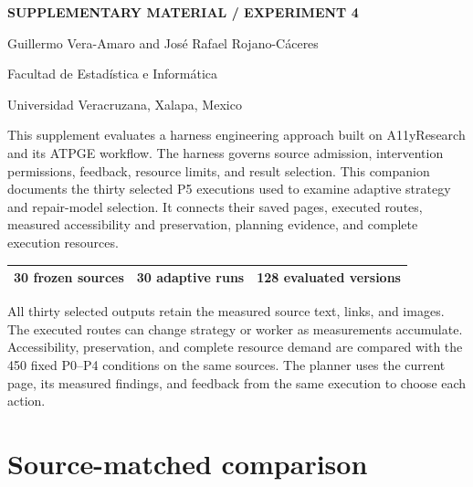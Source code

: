 \documentclass[acmsmall,screen,nonacm]{acmart}
\begin{document}
\raggedbottom
\pagestyle{plain}
\begin{titlepage}
\vspace*{12pt}
\noindent\textcolor{HarnessBlue}{\textbf{SUPPLEMENTARY MATERIAL / EXPERIMENT 4}}\par\bigskip
{}
\medskip
{}
\vspace{22pt}
\noindent Guillermo Vera-Amaro and José Rafael Rojano-Cáceres\par
\medskip
\noindent Facultad de Estadística e Informática\par
\noindent Universidad Veracruzana, Xalapa, Mexico\par
\vspace{24pt}
\noindent{\Large\bfseries\textcolor{HarnessBlue}{Experiment 4. Adaptive strategy and model selection}\par}
\medskip
This supplement evaluates a harness engineering approach built on A11yResearch and its ATPGE workflow. The harness governs source admission, intervention permissions, feedback, resource limits, and result selection. This companion documents the thirty selected P5 executions used to examine adaptive strategy and repair-model selection. It connects their saved pages, executed routes, measured accessibility and preservation, planning evidence, and complete execution resources.\par\bigskip
\noindent\begin{tabular*}{\linewidth}{@{\extracolsep{\fill}}lll@{}}\toprule
\textbf{30} frozen sources & \textbf{30} adaptive runs & \textbf{128} evaluated versions\\\bottomrule
\end{tabular*}\par\bigskip
All thirty selected outputs retain the measured source text, links, and images. The executed routes can change strategy or worker as measurements accumulate. Accessibility, preservation, and complete resource demand are compared with the 450 fixed P0--P4 conditions on the same sources. The planner uses the current page, its measured findings, and feedback from the same execution to choose each action.
\end{titlepage}

\section{Source-matched comparison}
\end{document}
